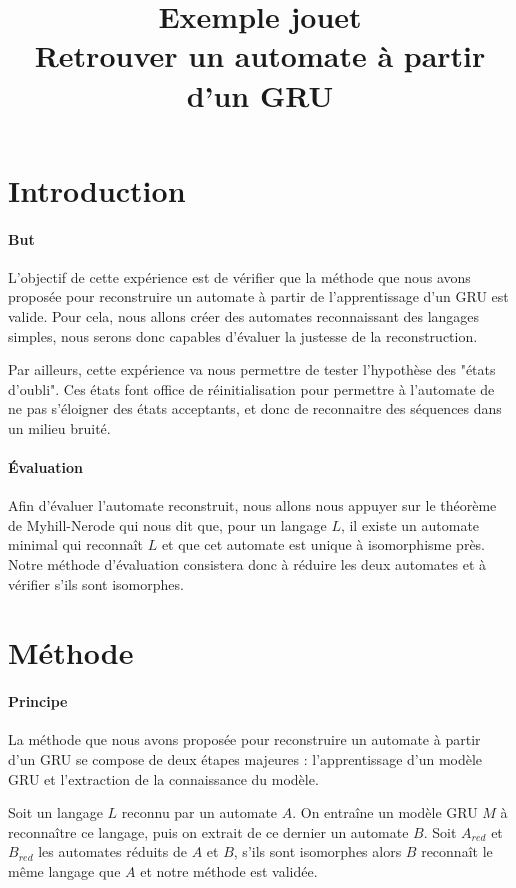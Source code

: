 \documentclass{article}
\title{Exemple jouet\\Retrouver un automate à partir d'un GRU}
\author{}
\date{}
\begin{document}
\maketitle


\newpage
\section{Introduction}
\paragraph{But} L'objectif de cette expérience est de vérifier que la méthode que nous avons proposée pour reconstruire un automate à 
partir de l'apprentissage d'un GRU est valide. Pour cela, nous allons créer des automates reconnaissant des langages 
simples, nous serons donc capables d'évaluer la justesse de la reconstruction.
\par Par ailleurs, cette expérience va nous permettre de tester l'hypothèse des "états d'oubli". Ces états font office de réinitialisation pour permettre
à l'automate de ne pas s'éloigner des états acceptants, et donc de reconnaitre des séquences dans un milieu bruité.

\paragraph{Évaluation} Afin d'évaluer l'automate reconstruit, nous allons nous appuyer sur le théorème de Myhill-Nerode 
qui nous dit que, pour un langage $L$, il existe un automate minimal qui reconnaît $L$ et que cet automate est unique 
à isomorphisme près. Notre méthode d'évaluation consistera donc à réduire les deux automates et à vérifier s'ils sont isomorphes.


\section{Méthode}

\paragraph{Principe} La méthode que nous avons proposée pour reconstruire un automate à partir d'un GRU se compose de deux 
étapes majeures : l'apprentissage d'un modèle GRU et l'extraction de la connaissance du modèle. 
\par Soit un langage $L$ reconnu par un automate $A$. On entraîne un modèle GRU $M$ à reconnaître ce langage, puis on 
extrait de ce dernier un automate $B$. Soit $A_{red}$ et $B_{red}$ les automates réduits de $A$ et $B$, s'ils sont
isomorphes alors $B$ reconnaît le même langage que $A$ et notre méthode est validée.
\end{document}
